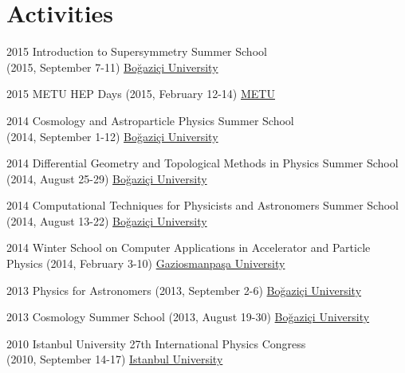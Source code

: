 \documentclass[]{friggeri-cv}
\begin{document}
\newpage



\section{Activities}

\begin{entrylist}
		 	
	\entry
	{2015}
	{Introduction to Supersymmetry  Summer School \\ \normalfont (2015, September 7-11)}
	{\href{http://fezagursey.boun.edu.tr/?sayfa=29}{Boğaziçi University}}
	
	\entry
	{2015}
	{METU HEP Days  \normalfont (2015, February 12-14)}
	{\href{http://yef.ankara.edu.tr/yefgunleri2015/index.html}{METU}}
		
	\entry
	{2014}
	{Cosmology and Astroparticle Physics Summer School \\ \normalfont (2014, September 1-12)}
	{\href{http://fezagursey.boun.edu.tr/?sayfa=33}{Boğaziçi University}}
		
	\entry
	{2014}
	{Differential Geometry and Topological Methods in Physics Summer School  \normalfont (2014, August 25-29)}
	{\href{http://fezagursey.boun.edu.tr/?sayfa=32}{Boğaziçi University}}
		
	\entry
	{2014}
	{Computational Techniques for Physicists and Astronomers Summer School  \normalfont (2014, August 13-22)}
	{\href{http://fezagursey.boun.edu.tr/?sayfa=31}{Boğaziçi University}}
	
	\entry
	{2014}
	{Winter School on Computer Applications in Accelerator and Particle Physics \normalfont (2014, February 3-10)}
	{\href{http://hpfbu.web.cern.ch/hpfbu/HPFBU2014/HPFBU2014.html}{Gaziosmanpaşa University}}
		
	\entry
	{2013}
	{Physics for Astronomers \normalfont (2013, September 2-6)}
	{\href{http://fezagursey.boun.edu.tr/?sayfa=36}{Boğaziçi University}}
	
  	\entry
  	{2013}
    {Cosmology Summer School \normalfont (2013, August 19-30)}
    {\href{http://fezagursey.boun.edu.tr/?sayfa=35}{Boğaziçi University}}
    
    \entry
    {2010}
    {Istanbul University 27th International Physics  Congress \\ \normalfont (2010, September 14-17)}
    {\href{http://www.tfd.com.tr/arsiv/TFD/27/Wc9f53756aa549.htm}{Istanbul University}}

\end{entrylist}
\end{document}

